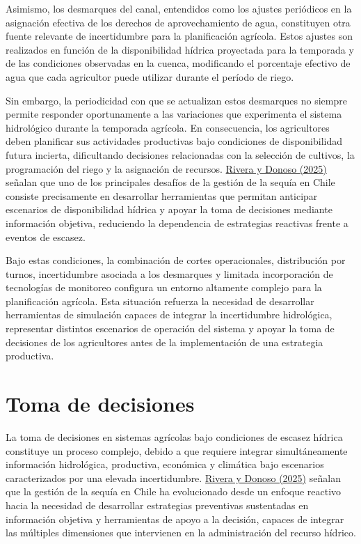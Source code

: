 \documentclass[12pt]{report}
\newcommand{\citeref}[2]{\hyperlink{ref:#1}{#2}}
\begin{document}
Asimismo, los desmarques del canal, entendidos como los ajustes periódicos en la asignación efectiva de los derechos de aprovechamiento de agua, constituyen otra fuente relevante de incertidumbre para la planificación agrícola. Estos ajustes son realizados en función de la disponibilidad hídrica proyectada para la temporada y de las condiciones observadas en la cuenca, modificando el porcentaje efectivo de agua que cada agricultor puede utilizar durante el período de riego.

Sin embargo, la periodicidad con que se actualizan estos desmarques no siempre permite responder oportunamente a las variaciones que experimenta el sistema hidrológico durante la temporada agrícola. En consecuencia, los agricultores deben planificar sus actividades productivas bajo condiciones de disponibilidad futura incierta, dificultando decisiones relacionadas con la selección de cultivos, la programación del riego y la asignación de recursos. \citeref{rivera2025}{Rivera y Donoso (2025)} señalan que uno de los principales desafíos de la gestión de la sequía en Chile consiste precisamente en desarrollar herramientas que permitan anticipar escenarios de disponibilidad hídrica y apoyar la toma de decisiones mediante información objetiva, reduciendo la dependencia de estrategias reactivas frente a eventos de escasez.

Bajo estas condiciones, la combinación de cortes operacionales, distribución por turnos, incertidumbre asociada a los desmarques y limitada incorporación de tecnologías de monitoreo configura un entorno altamente complejo para la planificación agrícola. Esta situación refuerza la necesidad de desarrollar herramientas de simulación capaces de integrar la incertidumbre hidrológica, representar distintos escenarios de operación del sistema y apoyar la toma de decisiones de los agricultores antes de la implementación de una estrategia productiva.

\section{Toma de decisiones}

La toma de decisiones en sistemas agrícolas bajo condiciones de escasez hídrica constituye un proceso complejo, debido a que requiere integrar simultáneamente información hidrológica, productiva, económica y climática bajo escenarios caracterizados por una elevada incertidumbre. \citeref{rivera2025}{Rivera y Donoso (2025)} señalan que la gestión de la sequía en Chile ha evolucionado desde un enfoque reactivo hacia la necesidad de desarrollar estrategias preventivas sustentadas en información objetiva y herramientas de apoyo a la decisión, capaces de integrar las múltiples dimensiones que intervienen en la administración del recurso hídrico.
\end{document}
